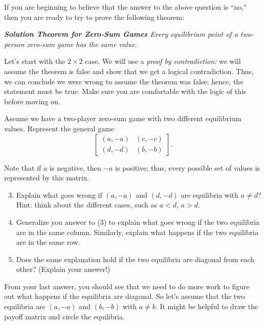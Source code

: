 If you are beginning to believe that the answer to the above question is ``no," then you are ready to try to prove the following theorem:
\vspace{.1in}

{\it{ \bf Solution Theorem for Zero-Sum Games} Every equilibrium point of a two-person zero-sum game  has the same value. }

\vspace{.1in}
Let's start with the $2 \times 2$ case. We will use a {\it proof by contradiction:} we will assume the theorem is false and show that we get a logical contradiction. Thus, we can conclude we were wrong to assume the theorem was false; hence, the statement must be true. Make sure you are comfortable with the logic of this before moving on.

Assume we have a two-player zero-sum game with two different equilibrium values. Represent the general game 
\[\left[\begin{matrix}
(a, -a)&(c, -c)\\
(d, -d)&(b, -b)

\end{matrix}\right].\]

Note that if $a$ is negative, then $-a$ is positive; thus, every possible set of values is represented by this matrix.

\begin{enumerate}
\setcounter{enumi}{2}

\item Explain what goes wrong if $(a, -a)$ and $(d, -d)$ are equilibria with $a \neq d$? Hint: think about the different cases, such as $a<d$, $a>d$. 

\item Generalize you answer to (3) to explain what goes wrong if the two equilibria are in the same column. Similarly, explain what happens if the two equilibria are in the  same row.

\item Does the same explanation hold if the two equilibria are diagonal from each other? (Explain your answer!)
\vspace{.1in}

\end{enumerate}

From your last answer, you should see that we need to do more work to figure out what happens if the equilibria are diagonal. So let's assume that the two equilibria are $(a, -a)$ and $(b, -b)$ with $a \neq b$. It might be helpful to draw the payoff matrix and circle the equilibria.

